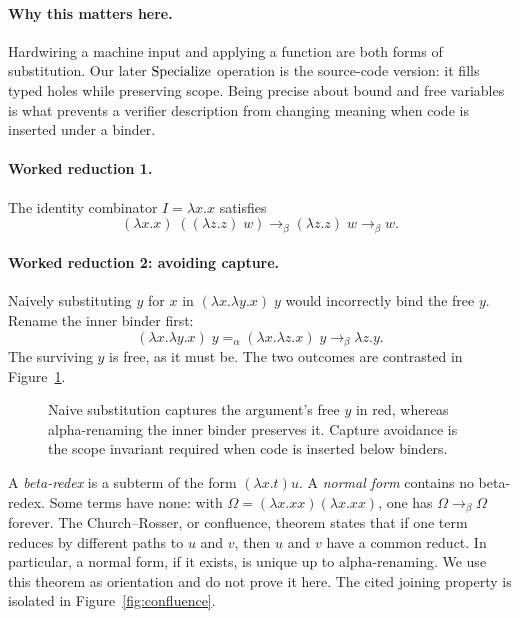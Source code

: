 \paragraph{Why this matters here.}
Hardwiring a machine input and applying a function are both forms of
substitution.  Our later \(\operatorname{Specialize}\) operation is the source-code version:
it fills typed holes while preserving scope.  Being precise about bound and
free variables is what prevents a verifier description from changing meaning
when code is inserted under a binder.

\paragraph{Worked reduction 1.}
The identity combinator \(I=\lambda x.x\) satisfies
\[
 (\lambda x.x)\;((\lambda z.z)\;w)
 \longrightarrow_\beta (\lambda z.z)\;w
 \longrightarrow_\beta w.
\]

\paragraph{Worked reduction 2: avoiding capture.}
Naively substituting \(y\) for \(x\) in
\((\lambda x.\lambda y.x)\;y\) would incorrectly bind the free \(y\).
Rename the inner binder first:
\[
 (\lambda x.\lambda y.x)\;y
 =_\alpha(\lambda x.\lambda z.x)\;y
 \longrightarrow_\beta\lambda z.y.
\]
The surviving \(y\) is free, as it must be.
The two outcomes are contrasted in Figure~\ref{fig:capture}.

\begin{figure}[ht]
\centering

\caption{Naive substitution captures the argument's free $y$ in red, whereas alpha-renaming the inner binder preserves it.  Capture avoidance is the scope invariant required when code is inserted below binders.}
\label{fig:capture}
\end{figure}

A \emph{beta-redex} is a subterm of the form \((\lambda x.t)u\).  A
\emph{normal form} contains no beta-redex.  Some terms have none: with
\(\Omega=(\lambda x.xx)(\lambda x.xx)\), one has
\(\Omega\to_\beta\Omega\) forever.  The Church--Rosser, or confluence,
theorem states that if one term reduces by different paths to \(u\) and \(v\),
then \(u\) and \(v\) have a common reduct.  In particular, a normal form, if
it exists, is unique up to alpha-renaming.  We use this theorem as orientation
and do not prove it here.
The cited joining property is isolated in Figure~\ref{fig:confluence}.


